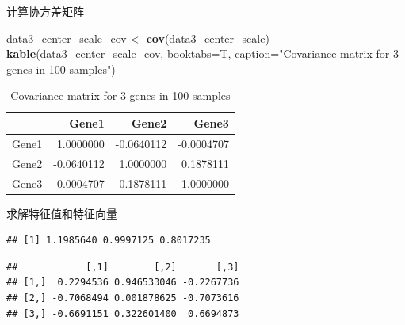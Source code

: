 \documentclass[]{article}
\newenvironment{Shaded}{\begin{snugshade}}{\end{snugshade}}
\newcommand{\KeywordTok}[1]{\textcolor[rgb]{0.13,0.29,0.53}{\textbf{{#1}}}}
\newcommand{\DataTypeTok}[1]{\textcolor[rgb]{0.13,0.29,0.53}{{#1}}}
\newcommand{\StringTok}[1]{\textcolor[rgb]{0.31,0.60,0.02}{{#1}}}
\newcommand{\CommentTok}[1]{\textcolor[rgb]{0.56,0.35,0.01}{\textit{{#1}}}}
\newcommand{\NormalTok}[1]{{#1}}
\numberwithin{figure}{section}
\numberwithin{table}{section}
\theoremstyle{definition}
\theoremstyle{definition}
\theoremstyle{definition}
\theoremstyle{remark}
\begin{document}
计算协方差矩阵

\begin{Shaded}
\begin{Highlighting}[]
\NormalTok{data3_center_scale_cov <-}\StringTok{ }\KeywordTok{cov}\NormalTok{(data3_center_scale)}
\KeywordTok{kable}\NormalTok{(data3_center_scale_cov, }\DataTypeTok{booktabs=}\NormalTok{T, }
        \DataTypeTok{caption=}\StringTok{"Covariance matrix for 3 genes in 100 samples"}\NormalTok{)}
\end{Highlighting}
\end{Shaded}

\begin{table}

\caption{\label{tab:covdata3}Covariance matrix for 3 genes in 100 samples}
\centering
\begin{tabular}[t]{lrrr}
\toprule
  & Gene1 & Gene2 & Gene3\\
\midrule
Gene1 & 1.0000000 & -0.0640112 & -0.0004707\\
Gene2 & -0.0640112 & 1.0000000 & 0.1878111\\
Gene3 & -0.0004707 & 0.1878111 & 1.0000000\\
\bottomrule
\end{tabular}
\end{table}

求解特征值和特征向量

\begin{Shaded}
\end{Shaded}

\begin{verbatim}
## [1] 1.1985640 0.9997125 0.8017235
\end{verbatim}

\begin{Shaded}
\end{Shaded}

\begin{verbatim}
##            [,1]        [,2]       [,3]
## [1,]  0.2294536 0.946533046 -0.2267736
## [2,] -0.7068494 0.001878625 -0.7073616
## [3,] -0.6691151 0.322601400  0.6694873
\end{verbatim}
\end{document}
